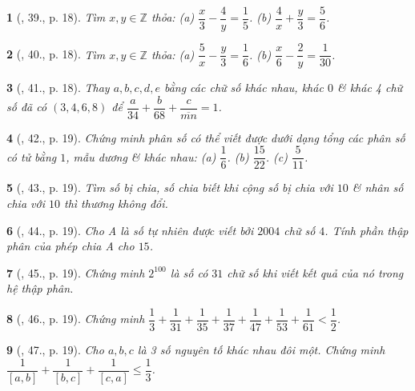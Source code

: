 \documentclass{article}
\newtheorem{baitoan}{}
\begin{document}
\begin{baitoan}[\cite{Binh_Toan_6_tap_2}, 39., p. 18]
	Tìm $x,y\in\mathbb{Z}$ thỏa: (a) $\dfrac{x}{3} - \dfrac{4}{y} = \dfrac{1}{5}$. (b) $\dfrac{4}{x} + \dfrac{y}{3} = \dfrac{5}{6}$.
\end{baitoan}

\begin{baitoan}[\cite{Binh_Toan_6_tap_2}, 40., p. 18]
	Tìm $x,y\in\mathbb{Z}$ thỏa: (a) $\dfrac{5}{x} - \dfrac{y}{3} = \dfrac{1}{6}$. (b) $\dfrac{x}{6} - \dfrac{2}{y} = \dfrac{1}{30}$.
\end{baitoan}

\begin{baitoan}[\cite{Binh_Toan_6_tap_2}, 41., p. 18]
	Thay $a,b,c,d,e$ bằng các chữ số khác nhau, khác $0$ \& khác 4 chữ số đã có $(3,4,6,8)$ để $\dfrac{a}{34} + \dfrac{b}{68} + \dfrac{c}{\overline{mn}} = 1$.
\end{baitoan}

\begin{baitoan}[\cite{Binh_Toan_6_tap_2}, 42., p. 19]
	Chứng minh phân số có thể viết được dưới dạng tổng các phân số có tử bằng $1$, mẫu dương \& khác nhau: (a) $\dfrac{1}{6}$. (b) $\dfrac{15}{22}$. (c) $\dfrac{5}{11}$.
\end{baitoan}

\begin{baitoan}[\cite{Binh_Toan_6_tap_2}, 43., p. 19]
	Tìm số bị chia, số chia biết khi cộng số bị chia với $10$ \& nhân số chia với $10$ thì thương không đổi.
\end{baitoan}

\begin{baitoan}[\cite{Binh_Toan_6_tap_2}, 44., p. 19]
	Cho A là số tự nhiên được viết bởi $2004$ chữ số $4$. Tính phần thập phân của phép chia A cho $15$.
\end{baitoan}

\begin{baitoan}[\cite{Binh_Toan_6_tap_2}, 45., p. 19]
	Chứng minh $2^{100}$ là số có $31$ chữ số khi viết kết quả của nó trong hệ thập phân.
\end{baitoan}

\begin{baitoan}[\cite{Binh_Toan_6_tap_2}, 46., p. 19]
	Chứng minh $\dfrac{1}{3} + \dfrac{1}{31} + \dfrac{1}{35} + \dfrac{1}{37} + \dfrac{1}{47} + \dfrac{1}{53} + \dfrac{1}{61} < \dfrac{1}{2}$.
\end{baitoan}

\begin{baitoan}[\cite{Binh_Toan_6_tap_2}, 47., p. 19]
	Cho $a,b,c$ là 3 số nguyên tố khác nhau đôi một. Chứng minh $\dfrac{1}{[a,b]} + \dfrac{1}{[b,c]} + \dfrac{1}{[c,a]}\le\dfrac{1}{3}$.
\end{baitoan}
\end{document}
